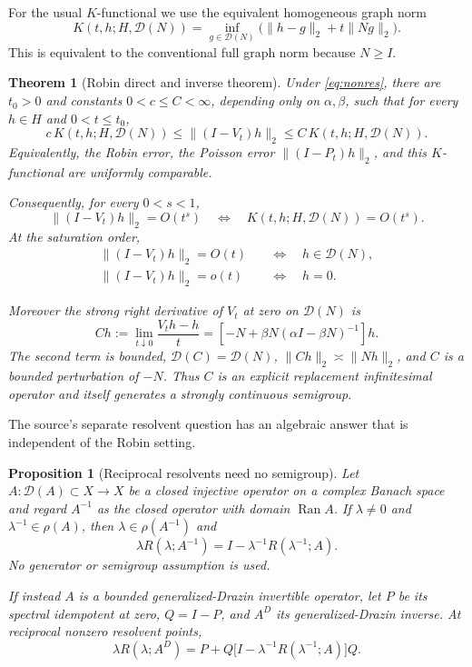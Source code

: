 \documentclass[11pt]{article}
\newtheorem{theorem}{Theorem}
\newtheorem{proposition}{Proposition}
\newcommand{\D}{\mathcal D}
\newcommand{\Rop}{R}
\begin{document}
For the usual $K$-functional we use the equivalent homogeneous graph norm
\[
 K(t,h;H,\D(N))=
 \inf_{g\in\D(N)}\bigl(\|h-g\|_2+t\|Ng\|_2\bigr).
\]
This is equivalent to the conventional full graph norm because $N\geq I$.

\begin{theorem}[Robin direct and inverse theorem]\label{thm:main}
Under \eqref{eq:nonres}, there are $t_0>0$ and constants $0<c\leq C<\infty$,
depending only on $\alpha,\beta$, such that for every $h\in H$ and
$0<t\leq t_0$,
\begin{equation}\label{eq:threeway}
 c\,K(t,h;H,\D(N))
 \leq \|(I-V_t)h\|_2
 \leq C\,K(t,h;H,\D(N)).
\end{equation}
Equivalently, the Robin error, the Poisson error
$\|(I-P_t)h\|_2$, and this $K$-functional are uniformly comparable.

Consequently, for every $0<s<1$,
\[
 \|(I-V_t)h\|_2=O(t^s)
 \quad\Longleftrightarrow\quad
 K(t,h;H,\D(N))=O(t^s).
\]
At the saturation order,
\begin{align*}
 \|(I-V_t)h\|_2=O(t)&\quad\Longleftrightarrow\quad h\in\D(N),\\
 \|(I-V_t)h\|_2=o(t)&\quad\Longleftrightarrow\quad h=0.
\end{align*}

Moreover the strong right derivative of $V_t$ at zero on $\D(N)$ is
\begin{equation}\label{eq:C}
 Ch:=\lim_{t\downarrow0}\frac{V_th-h}{t}
 =\left[-N+\beta N(\alpha I-\beta N)^{-1}\right]h.
\end{equation}
The second term is bounded, $\D(C)=\D(N)$,
$\|Ch\|_2\asymp\|Nh\|_2$, and $C$ is a bounded perturbation of $-N$.
Thus $C$ is an explicit replacement infinitesimal operator and itself
generates a strongly continuous semigroup.
\end{theorem}

The source's separate resolvent question has an algebraic answer that is
independent of the Robin setting.

\begin{proposition}[Reciprocal resolvents need no semigroup]\label{prop:res}
Let $A:\D(A)\subset X\to X$ be a closed injective operator on a complex
Banach space and regard $A^{-1}$ as the closed operator with domain
$\operatorname{Ran}A$.  If $\lambda\neq0$ and
$\lambda^{-1}\in\rho(A)$, then $\lambda\in\rho(A^{-1})$ and
\begin{equation}\label{eq:res}
 \lambda\Rop(\lambda;A^{-1})
 =I-\lambda^{-1}\Rop(\lambda^{-1};A).
\end{equation}
No generator or semigroup assumption is used.

If instead $A$ is a bounded generalized-Drazin invertible operator, let $P$
be its spectral idempotent at zero, $Q=I-P$, and $A^D$ its generalized-Drazin
inverse.  At reciprocal nonzero resolvent points,
\begin{equation}\label{eq:drazin}
 \lambda\Rop(\lambda;A^D)
 =P+Q\bigl[I-\lambda^{-1}\Rop(\lambda^{-1};A)\bigr]Q.
\end{equation}
\end{proposition}
\end{document}

